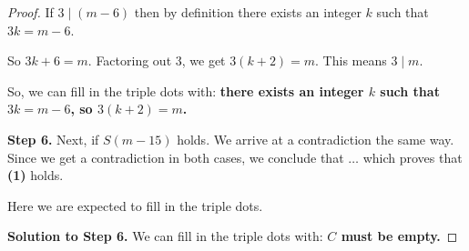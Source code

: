 \documentclass[14pt]{extarticle}
\begin{document}
\begin{proof}
If $3 \mid (m-6)$ then by definition there exists an integer $k$ such that $3k = m-6$. 

So $3k+6= m$. Factoring out 3, we get $3(k+2) = m$. This means $3 \mid m$.

So, we can fill in the triple dots with: \textbf{there exists an integer $k$ such that $3k = m-6$, so $3(k+2) = m$.}

\textbf{Step 6.} Next, if $S(m-15)$ holds. We arrive at a contradiction the same way. Since we get a contradiction in both cases, we conclude that $\ldots$ which proves that \textbf{(1)} holds.

Here we are expected to fill in the triple dots. 

\textbf{Solution to Step 6.} We can fill in the triple dots with: \textbf{$C$ must be empty.}
\end{proof}
\end{document}
